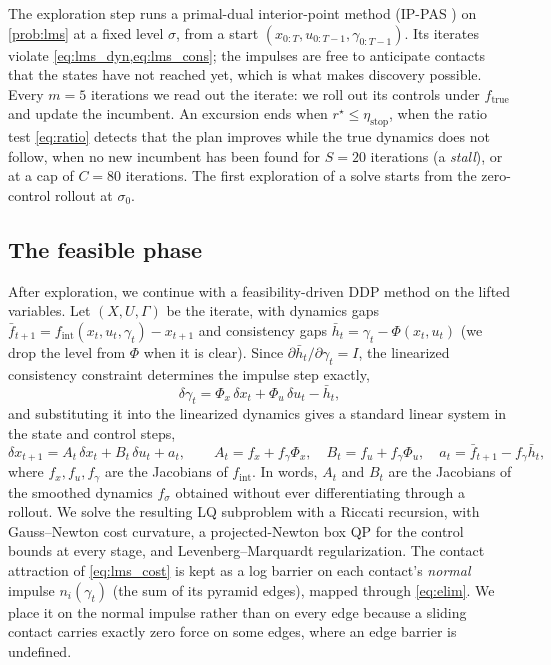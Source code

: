 \documentclass[11pt]{article}
\theoremstyle{remark}
\newcommand{\ftrue}{f_{\mathrm{true}}}
\newcommand{\fint}{f_{\mathrm{int}}}
\newcommand{\etastop}{\eta_{\mathrm{stop}}}
\newcommand{\rinc}{r^\star}
\begin{document}
The exploration step runs a primal-dual interior-point method (IP-PAS \cite{li2027lifted}) on \cref{prob:lms} at a fixed level $\sigma$, from a start $(x_{0:T}, u_{0:T-1}, \gamma_{0:T-1})$. Its iterates violate \cref{eq:lms_dyn,eq:lms_cons}; the impulses are free to anticipate contacts that the states have not reached yet, which is what makes discovery possible. Every $m = 5$ iterations we read out the iterate: we roll out its controls under $\ftrue$ and update the incumbent. An excursion ends when $\rinc \leq \etastop$, when the ratio test \cref{eq:ratio} detects that the plan improves while the true dynamics does not follow, when no new incumbent has been found for $S = 20$ iterations (a \emph{stall}), or at a cap of $C = 80$ iterations. The first exploration of a solve starts from the zero-control rollout at $\sigma_0$.

\subsection{The feasible phase}
\label{sec:lfddp}

After exploration, we continue with a feasibility-driven DDP method on the lifted variables. Let $(X, U, \Gamma)$ be the iterate, with dynamics gaps $\bar f_{t+1} = \fint(x_t, u_t, \gamma_t) - x_{t+1}$ and consistency gaps $\bar h_t = \gamma_t - \Phi(x_t, u_t)$ (we drop the level from $\Phi$ when it is clear). Since $\partial \bar h_t / \partial \gamma_t = I$, the linearized consistency constraint determines the impulse step exactly,
\begin{equation}
\label{eq:elim}
\delta\gamma_t = \Phi_x\, \delta x_t + \Phi_u\, \delta u_t - \bar h_t,
\end{equation}
and substituting it into the linearized dynamics gives a standard linear system in the state and control steps,
\begin{equation}
\label{eq:lin}
\delta x_{t+1} = A_t\, \delta x_t + B_t\, \delta u_t + a_t, \qquad A_t = f_x + f_\gamma \Phi_x, \quad B_t = f_u + f_\gamma \Phi_u, \quad a_t = \bar f_{t+1} - f_\gamma \bar h_t,
\end{equation}
where $f_x, f_u, f_\gamma$ are the Jacobians of $\fint$. In words, $A_t$ and $B_t$ are the Jacobians of the smoothed dynamics $f_\sigma$ obtained without ever differentiating through a rollout. We solve the resulting LQ subproblem with a Riccati recursion, with Gauss--Newton cost curvature, a projected-Newton box QP for the control bounds at every stage, and Levenberg--Marquardt regularization. The contact attraction of \cref{eq:lms_cost} is kept as a log barrier on each contact's \emph{normal} impulse $n_i(\gamma_t)$ (the sum of its pyramid edges), mapped through \cref{eq:elim}. We place it on the normal impulse rather than on every edge because a sliding contact carries exactly zero force on some edges, where an edge barrier is undefined.
\end{document}
